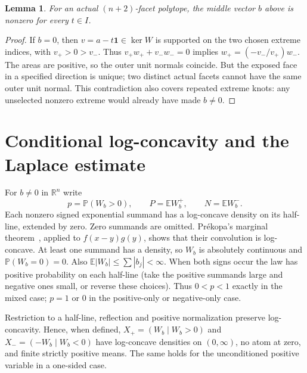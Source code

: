 \documentclass[11pt]{article}
\newtheorem{lemma}[theorem]{Lemma}
\theoremstyle{remark}\newtheorem{remark}[theorem]{Remark}
\newcommand{\R}{\mathbb R}
\newcommand{\E}{\mathbb E}
\newcommand{\Prob}{\mathbb P}
\newcommand{\one}{\mathbf 1}
\numberwithin{equation}{section}
\begin{document}
\begin{lemma}\label{lem:nonzero}
For an actual $(n+2)$-facet polytope, the middle vector $b$ above is
nonzero for every $t\in I$.
\end{lemma}
\begin{proof}
If $b=0$, then $v=a-t\one\in\ker W$ is supported on the two chosen
extreme indices, with $v_+>0>v_-$. Thus
$v_+w_++v_-w_-=0$ implies $w_+=(-v_-/v_+)w_-$.
The areas are positive, so the outer unit normals coincide. But the
exposed face in a specified direction is unique; two distinct actual
facets cannot have the same outer unit normal. This contradiction
also covers repeated extreme knots: any unselected nonzero extreme
would already have made $b\ne0$.
\end{proof}

\section{Conditional log-concavity and the Laplace estimate}
For $b\ne0$ in $\R^n$ write
\[
 p=\Prob(W_b>0),\qquad P=\E W_b^+,\qquad N=\E W_b^-.
\]
Each nonzero signed exponential summand has a log-concave density on
its half-line, extended by zero. Zero summands are omitted. Pr\'ekopa's
marginal theorem~\cite[Theorems 6--8]{Prekopa}, applied to
$f(x-y)g(y)$, shows that their convolution is log-concave. At least one
summand has a density, so $W_b$ is absolutely continuous and
$\Prob(W_b=0)=0$. Also $\E|W_b|\le\sum|b_j|<\infty$.
When both signs occur the law has positive probability on each
half-line (take the positive summands large and negative ones small,
or reverse these choices). Thus $0<p<1$ exactly in the mixed case;
$p=1$ or $0$ in the positive-only or negative-only case.

Restriction to a half-line, reflection and positive normalization
preserve log-concavity. Hence, when defined, $X_+=(W_b\mid W_b>0)$
and $X_-=(-W_b\mid W_b<0)$ have log-concave densities on $(0,\infty)$,
no atom at zero, and finite strictly positive means. The same holds for
the unconditioned positive variable in a one-sided case.
\end{document}
